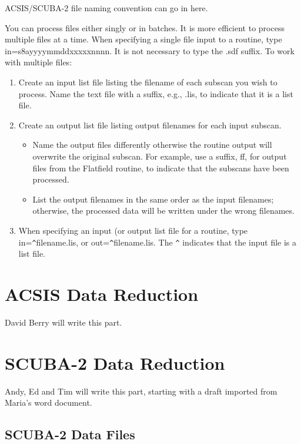 \documentclass[twoside,11pt]{article}
\newcommand{\xlabel}[1]{}
\renewcommand{\_}{\texttt{\symbol{95}}}
\begin{document}
ACSIS/SCUBA-2 file naming convention can go in here.

You can process files either singly or in batches. It is more
efficient to process multiple files at a time. When specifying a
single file input to a routine, type in=s8ayyyymmdd\_xxxxx\_nnnn. It
is not necessary to type the .sdf suffix. To work with multiple files:
\begin{enumerate}
\item Create an input list file listing the filename of each subscan
  you wish to process. Name the text file with a suffix, e.g., .lis,
  to indicate that it is a list file.
\item Create an output list file listing output filenames for each input subscan.
  \begin{itemize}
  \item Name the output files differently otherwise the routine output
    will overwrite the original subscan. For example, use a suffix,
    \_ff, for output files from the Flatfield routine, to indicate
    that the subscans have been processed.
  \item List the output filenames in the same order as the input
    filenames; otherwise, the processed data will be written under the
    wrong filenames.  
  \end{itemize}
\item When specifying an input (or output list file for a routine,
  type in=\verb-^-filename.lis, or out=\verb-^-filename.lis.  The
  \verb-^- indicates that the input file is a list file.
\end{enumerate}

\section{\xlabel{acsis}ACSIS Data Reduction}

David Berry will write this part.

\section{\xlabel{scuba2}SCUBA-2 Data Reduction}

Andy, Ed and Tim will write this part, starting with a draft imported
from Maria's word document.

\subsection{SCUBA-2 Data Files}
\end{document}
